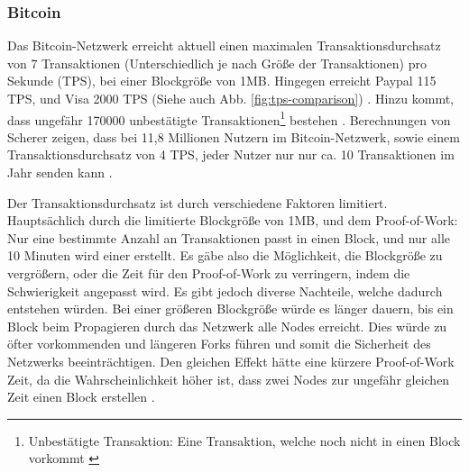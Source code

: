 \subsubsection{Bitcoin}
Das Bitcoin-Netzwerk erreicht aktuell einen maximalen Transaktionsdurchsatz von 7 Transaktionen (Unterschiedlich je nach Größe der Transaktionen) pro Sekunde (TPS), bei einer Blockgröße von 1MB.  Hingegen erreicht Paypal 115 TPS, und Visa 2000 TPS (Siehe auch Abb. \ref{fig:tps-comparison}) \cite{ScalabilityBitcoinWiki}. Hinzu kommt, dass ungefähr 170000 unbestätigte Transaktionen\footnote{Unbestätigte Transaktion: Eine Transaktion, welche noch nicht in einen Block vorkommt \cite{AntonopoulosMasteringbitcoin2015}} bestehen \cite{BlockchainFirmaBlockchainChartsUnbestatigte}. Berechnungen von Scherer zeigen, dass bei 11,8 Millionen Nutzern im Bitcoin-Netzwerk, sowie einem Transaktionsdurchsatz von 4 TPS, jeder Nutzer nur nur ca. 10 Transaktionen im Jahr senden kann \cite{SchererPerformanceScalabilityBlockchain2017}.

Der Transaktionsdurchsatz ist durch verschiedene Faktoren limitiert. Hauptsächlich durch die limitierte Blockgröße von 1MB, und dem Proof-of-Work: Nur eine bestimmte Anzahl an Transaktionen passt in einen Block, und nur alle 10 Minuten wird einer erstellt. Es gäbe also die Möglichkeit, die Blockgröße zu vergrößern, oder die Zeit für den Proof-of-Work zu verringern, indem die Schwierigkeit angepasst wird. Es gibt jedoch diverse Nachteile, welche dadurch entstehen würden. Bei einer größeren Blockgröße würde es länger dauern, bis ein Block beim Propagieren durch das Netzwerk alle Nodes erreicht. Dies würde zu öfter vorkommenden und längeren Forks führen und somit die Sicherheit des Netzwerks beeinträchtigen. Den gleichen Effekt hätte eine kürzere Proof-of-Work Zeit, da die Wahrscheinlichkeit höher ist, dass zwei Nodes zur ungefähr gleichen Zeit einen Block erstellen \cite{SchererPerformanceScalabilityBlockchain2017} \cite{EthereumWhitepaper2017} \cite{SompolinskyAcceleratingBitcoinTransaction2013}. 

